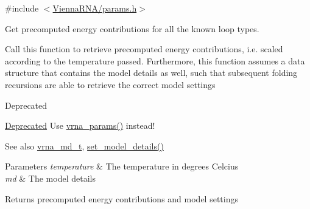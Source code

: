 {\ttfamily \#include $<$\hyperlink{params_8h}{Vienna\+R\+N\+A/params.\+h}$>$}



Get precomputed energy contributions for all the known loop types. 

Call this function to retrieve precomputed energy contributions, i.\+e. scaled according to the temperature passed. Furthermore, this function assumes a data structure that contains the model details as well, such that subsequent folding recursions are able to retrieve the correct model settings

\begin{DoxyRefDesc}{Deprecated}
\item[\hyperlink{deprecated__deprecated000098}{Deprecated}]Use \hyperlink{group__energy__parameters_gad0e3e7e74bdc50d1709d40c92993185e}{vrna\+\_\+params()} instead!\end{DoxyRefDesc}


\begin{DoxySeeAlso}{See also}
\hyperlink{group__model__details_ga1f8a10e12a0a1915f2a4eff0b28ea17c}{vrna\+\_\+md\+\_\+t}, \hyperlink{group__model__details_gabad896c3650d420f3f3ddefc69e2bceb}{set\+\_\+model\+\_\+details()}
\end{DoxySeeAlso}

\begin{DoxyParams}{Parameters}
{\em temperature} & The temperature in degrees Celcius \\
\hline
{\em md} & The model details \\
\hline
\end{DoxyParams}
\begin{DoxyReturn}{Returns}
precomputed energy contributions and model settings 
\end{DoxyReturn}
